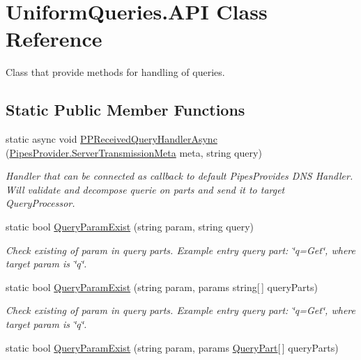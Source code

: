 \hypertarget{class_uniform_queries_1_1_a_p_i}{}\section{Uniform\+Queries.\+A\+PI Class Reference}
\label{class_uniform_queries_1_1_a_p_i}


Class that provide methods for handling of queries.  


\subsection*{Static Public Member Functions}
\begin{DoxyCompactItemize}
\item 
static async void \mbox{\hyperlink{class_uniform_queries_1_1_a_p_i_ae1b8242cd1055572d996ff97b5653345}{P\+P\+Received\+Query\+Handler\+Async}} (\mbox{\hyperlink{class_pipes_provider_1_1_server_transmission_meta}{Pipes\+Provider.\+Server\+Transmission\+Meta}} meta, string query)
\begin{DoxyCompactList}\small\item\em Handler that can be connected as callback to default Pipes\+Provides D\+NS Handler. Will validate and decompose querie on parts and send it to target Query\+Processor. \end{DoxyCompactList}\item 
static bool \mbox{\hyperlink{class_uniform_queries_1_1_a_p_i_a1a0ad73e1dad7f7ec61398cb33ec18a4}{Query\+Param\+Exist}} (string param, string query)
\begin{DoxyCompactList}\small\item\em Check existing of param in query parts. Example entry query part\+: \char`\"{}q=\+Get\char`\"{}, where target param is \char`\"{}q\char`\"{}. \end{DoxyCompactList}\item 
static bool \mbox{\hyperlink{class_uniform_queries_1_1_a_p_i_a0f6c53ca64000015c8bf7bed30d9c57a}{Query\+Param\+Exist}} (string param, params string\mbox{[}$\,$\mbox{]} query\+Parts)
\begin{DoxyCompactList}\small\item\em Check existing of param in query parts. Example entry query part\+: \char`\"{}q=\+Get\char`\"{}, where target param is \char`\"{}q\char`\"{}. \end{DoxyCompactList}\item 
static bool \mbox{\hyperlink{class_uniform_queries_1_1_a_p_i_ac0f8c9faebdc4a69f2072c0bb9e955e1}{Query\+Param\+Exist}} (string param, params \mbox{\hyperlink{struct_uniform_queries_1_1_query_part}{Query\+Part}}\mbox{[}$\,$\mbox{]} query\+Parts)

\end{DoxyCompactItemize}
